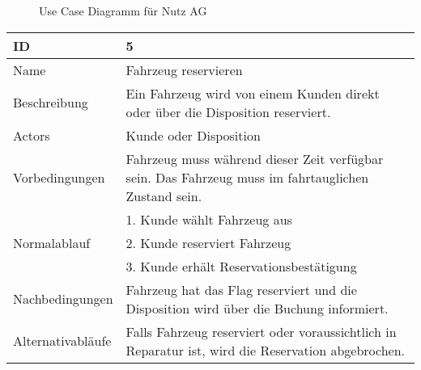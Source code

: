 \documentclass[12pt,article]{memoir}
\begin{document}
\begin{center}
\begin{figure}[h!]
\caption{Use Case Diagramm für Nutz AG}
\end{figure}
\end{center}



\begin{tabular}{|l|p{13cm}|}
	\hline
	ID & 5\\
	\hline
  Name & Fahrzeug reservieren\\
  \hline
  Beschreibung & Ein Fahrzeug wird von einem Kunden direkt oder über die Disposition reserviert. \\
  \hline
  Actors & Kunde oder Disposition\\
  \hline
  Vorbedingungen & Fahrzeug muss während dieser Zeit verfügbar sein. Das Fahrzeug muss im fahrtauglichen Zustand sein.\\
  \hline
  \multirow{3}{*}{Normalablauf} & 1. Kunde wählt Fahrzeug aus \\
  & 2. Kunde reserviert Fahrzeug \\
  & 3. Kunde erhält Reservationsbestätigung \\
  \hline
  Nachbedingungen & Fahrzeug hat das Flag reserviert und die Disposition wird über die Buchung informiert.\\
  \hline
  Alternativabläufe & Falls Fahrzeug reserviert oder voraussichtlich in Reparatur ist, wird die Reservation abgebrochen. \\
  \hline
\end{tabular}
\end{document}
